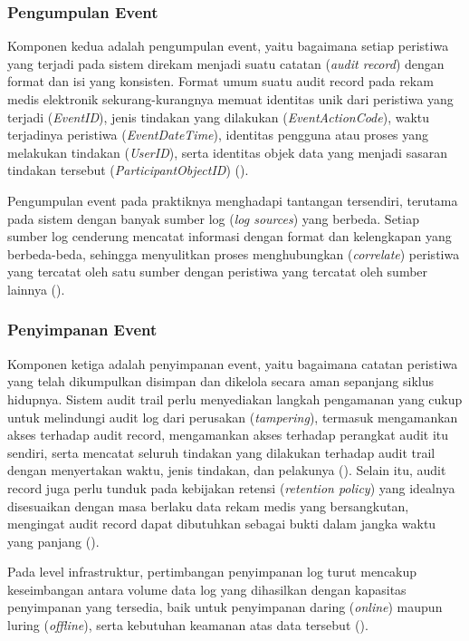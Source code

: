 \subsubsection{Pengumpulan Event}
\label{subsubsec:pengumpulan-event}

Komponen kedua adalah pengumpulan event, yaitu bagaimana setiap peristiwa yang terjadi pada sistem direkam menjadi suatu catatan (\textit{audit record}) dengan format dan isi yang konsisten. Format umum suatu audit record pada rekam medis elektronik sekurang-kurangnya memuat identitas unik dari peristiwa yang terjadi (\textit{EventID}), jenis tindakan yang dilakukan (\textit{EventActionCode}), waktu terjadinya peristiwa (\textit{EventDateTime}), identitas pengguna atau proses yang melakukan tindakan (\textit{UserID}), serta identitas objek data yang menjadi sasaran tindakan tersebut (\textit{ParticipantObjectID}) (\cite{iso27789_2021}).

Pengumpulan event pada praktiknya menghadapi tantangan tersendiri, terutama pada sistem dengan banyak sumber log (\textit{log sources}) yang berbeda. Setiap sumber log cenderung mencatat informasi dengan format dan kelengkapan yang berbeda-beda, sehingga menyulitkan proses menghubungkan (\textit{correlate}) peristiwa yang tercatat oleh satu sumber dengan peristiwa yang tercatat oleh sumber lainnya (\cite{nist80092}).

\subsubsection{Penyimpanan Event}
\label{subsubsec:penyimpanan-event}

Komponen ketiga adalah penyimpanan event, yaitu bagaimana catatan peristiwa yang telah dikumpulkan disimpan dan dikelola secara aman sepanjang siklus hidupnya. Sistem audit trail perlu menyediakan langkah pengamanan yang cukup untuk melindungi audit log dari perusakan (\textit{tampering}), termasuk mengamankan akses terhadap audit record, mengamankan akses terhadap perangkat audit itu sendiri, serta mencatat seluruh tindakan yang dilakukan terhadap audit trail dengan menyertakan waktu, jenis tindakan, dan pelakunya (\cite{iso27789_2021}). Selain itu, audit record juga perlu tunduk pada kebijakan retensi (\textit{retention policy}) yang idealnya disesuaikan dengan masa berlaku data rekam medis yang bersangkutan, mengingat audit record dapat dibutuhkan sebagai bukti dalam jangka waktu yang panjang (\cite{iso27789_2021}).

Pada level infrastruktur, pertimbangan penyimpanan log turut mencakup keseimbangan antara volume data log yang dihasilkan dengan kapasitas penyimpanan yang tersedia, baik untuk penyimpanan daring (\textit{online}) maupun luring (\textit{offline}), serta kebutuhan keamanan atas data tersebut (\cite{nist80092}).

